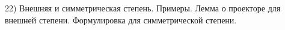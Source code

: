 22) Внешняя и симметрическая степень. Примеры. Лемма о проекторе для внешней степени. Формулировка для симметрической степени.
